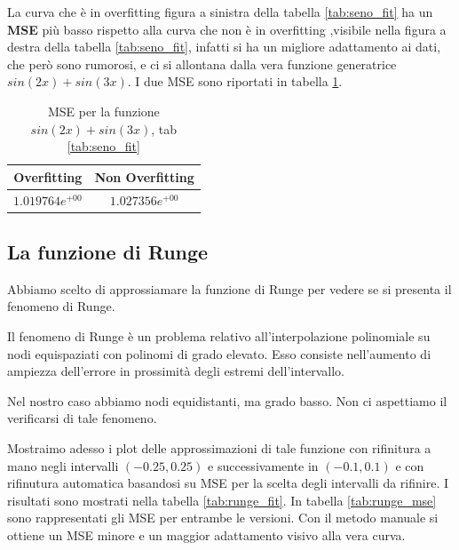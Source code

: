 \documentclass[../main.tex]{subfiles}
\begin{document}
\begin{remark}
    La curva che è in overfitting  figura a sinistra della tabella \ref{tab:seno_fit} ha un \textbf{MSE} più basso rispetto 
    alla curva che non è in overfitting ,visibile nella figura a destra della tabella \ref{tab:seno_fit}, 
    infatti si ha un migliore adattamento ai dati, 
    che però sono rumorosi, e ci si allontana dalla vera funzione generatrice $sin(2x) + sin(3x)$. 
    I due MSE sono riportati in tabella \ref{tab:seno_mse}.

    \begin{table}[h!]
        \centering
        \caption{MSE per la funzione $sin(2x) + sin(3x)$, tab \ref{tab:seno_fit}}\label{tab:seno_mse}
         \begin{tabular}{||c c ||} 
         \hline
         Overfitting & Non Overfitting \\ [0.5ex] 
         \hline\hline
         $1.019764e^{+00}$ & $1.027356e^{+00}$ \\  [1ex] 
         \hline
         \end{tabular}
        \end{table}
\end{remark}

\subsection{La funzione di Runge}
Abbiamo scelto di approssiamare la funzione di Runge per vedere se si presenta il fenomeno di Runge.
\begin{definition}
    Il fenomeno di Runge è un problema relativo all'interpolazione polinomiale su nodi equispaziati con polinomi di grado elevato. 
    Esso consiste nell'aumento di ampiezza dell'errore in prossimità degli estremi dell'intervallo.
\end{definition}
Nel nostro caso abbiamo nodi equidistanti, ma grado basso. Non ci aspettiamo il verificarsi di tale fenomeno.

Mostraimo adesso i plot delle approssimazioni di tale funzione con rifinitura a mano negli intervalli $(-0.25,0.25)$ e successivamente 
in $(-0.1,0.1)$ e con rifinutura automatica basandosi su MSE per la scelta degli intervalli da rifinire. I risultati sono mostrati nella 
tabella \ref{tab:runge_fit}.
In tabella \ref{tab:runge_mse} sono rappresentati gli MSE per entrambe le versioni. Con il metodo manuale si ottiene un MSE minore 
e un maggior adattamento visivo alla vera curva.
\end{document}
